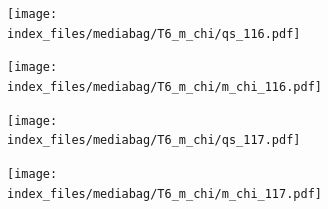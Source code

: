 \documentclass[
  11pt,
  letterpaper,
]{scrreprt}
\begin{document}
\begin{figure}

\begin{minipage}{0.50\linewidth}

\begin{figure}[H]

{\centering \texttt{[image: index\_files/mediabag/T6\_m\_chi/qs\_116.pdf]}

}


\end{figure}%

\end{minipage}%
%
\begin{minipage}{0.50\linewidth}

\begin{figure}[H]

{\centering \texttt{[image: index\_files/mediabag/T6\_m\_chi/m\_chi\_116.pdf]}

}


\end{figure}%

\end{minipage}%

\end{figure}%

\begin{figure}

\begin{minipage}{0.50\linewidth}

\begin{figure}[H]

{\centering \texttt{[image: index\_files/mediabag/T6\_m\_chi/qs\_117.pdf]}

}


\end{figure}%

\end{minipage}%
%
\begin{minipage}{0.50\linewidth}

\begin{figure}[H]

{\centering \texttt{[image: index\_files/mediabag/T6\_m\_chi/m\_chi\_117.pdf]}

}


\end{figure}%

\end{minipage}%

\end{figure}%
\end{document}
